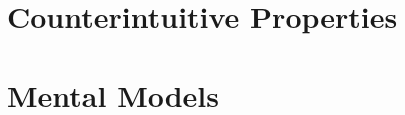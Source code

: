 \documentclass[a4paper, oneside]{discothesis}
\begin{document}
\section{Counterintuitive Properties}



\section{Mental Models}








\end{document}
